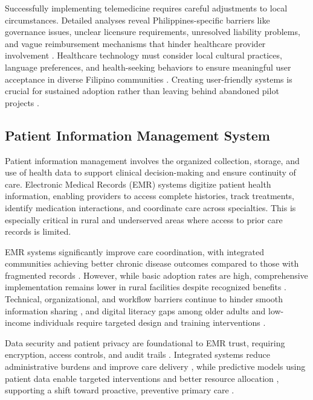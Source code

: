 \documentclass[12pt]{report}
\begin{document}
Successfully implementing telemedicine requires careful adjustments to local
circumstances. Detailed analyses reveal Philippines-specific barriers like
governance issues, unclear licensure requirements, unresolved liability
problems, and vague reimbursement mechanisms that hinder healthcare provider
involvement \cite{ref25, ref51}. Healthcare technology must consider local
cultural practices, language preferences, and health-seeking behaviors to
ensure meaningful user acceptance in diverse Filipino communities \cite{ref49}.
Creating user-friendly systems is crucial for sustained adoption rather than
leaving behind abandoned pilot projects \cite{ref63}.

\subsection*{Patient Information Management System}

Patient information management involves the organized collection, storage, and
use of health data to support clinical decision-making and ensure continuity
of care. Electronic Medical Records (EMR) systems digitize patient health
information, enabling providers to access complete histories, track treatments,
identify medication interactions, and coordinate care across specialties. This
is especially critical in rural and underserved areas where access to prior
care records is limited.

EMR systems significantly improve care coordination, with integrated
communities achieving better chronic disease outcomes compared to those with
fragmented records \cite{ref33, ref19}. However, while basic adoption rates
are high, comprehensive implementation remains lower in rural facilities despite
recognized benefits \cite{ref12, ref6}. Technical, organizational, and workflow
barriers continue to hinder smooth information sharing \cite{ref48, ref3,
ref38}, and digital literacy gaps among older adults and low-income individuals
require targeted design and training interventions \cite{ref1}.

Data security and patient privacy are foundational to EMR trust, requiring
encryption, access controls, and audit trails \cite{ref41}. Integrated systems
reduce administrative burdens and improve care delivery \cite{ref45, ref56,
ref26}, while predictive models using patient data enable targeted interventions
and better resource allocation \cite{ref17, ref13}, supporting a shift toward
proactive, preventive primary care \cite{ref11}.
\end{document}
